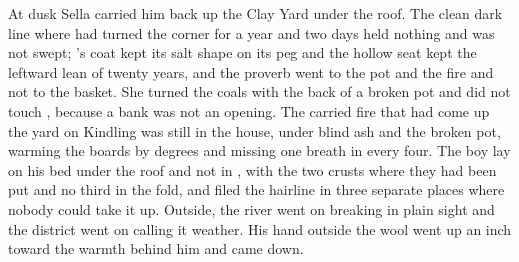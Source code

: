 At dusk Sella carried him back up the Clay Yard under the  roof. The clean dark line where  had turned the corner for a year and two days held nothing and was not swept; 's coat kept its salt shape on its peg and the hollow seat kept the leftward lean of twenty years, and the proverb went to the pot and the fire and not to the basket. She turned the coals with the back of a broken pot and did not touch , because a bank was not an opening. The carried fire that had come up the yard on Kindling was still in the house, under blind ash and the broken pot, warming the boards by degrees and missing one breath in every four. The boy lay on his bed under the roof and not in , with the two crusts where they had been put and no third in the fold, and filed the hairline in three separate places where nobody could take it up. Outside, the river went on breaking in plain sight and the district went on calling it weather. His hand outside the wool went up an inch toward the warmth behind him and came down.
